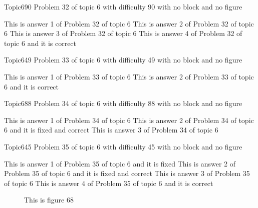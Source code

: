 \documentclass[master]{exam}
\begin{document}
\begin{problem}{Topic6}{90}
	Problem 32 of topic 6 with difficulty 90 with no block and no figure
	\begin{answers}
		\answer This is answer 1 of Problem 32 of topic 6 
		\answer This is answer 2 of Problem 32 of topic 6 
		\answer This is answer 3 of Problem 32 of topic 6 
		\answer[correct] This is answer 4 of Problem 32 of topic 6 and it is correct
	\end{answers}
\end{problem}

\begin{problem}{Topic6}{49}
	Problem 33 of topic 6 with difficulty 49 with no block and no figure
	\begin{answers}
		\answer This is answer 1 of Problem 33 of topic 6 
		\answer[correct] This is answer 2 of Problem 33 of topic 6 and it is correct
	\end{answers}
\end{problem}

\begin{problem}{Topic6}{88}
	Problem 34 of topic 6 with difficulty 88 with no block and no figure
	\begin{answers}
		\answer This is answer 1 of Problem 34 of topic 6 
		 This is answer 2 of Problem 34 of topic 6 and it is fixed and correct
		\answer This is answer 3 of Problem 34 of topic 6 
	\end{answers}
\end{problem}

\begin{problem}{Topic6}{45}
	Problem 35 of topic 6 with difficulty 45 with no block and no figure
	\begin{answers}
		\answer[fixed] This is answer 1 of Problem 35 of topic 6 and it is fixed
		 This is answer 2 of Problem 35 of topic 6 and it is fixed and correct
		\answer This is answer 3 of Problem 35 of topic 6 
		\answer[correct] This is answer 4 of Problem 35 of topic 6 and it is correct
	\end{answers}
\end{problem}



\begin{figure}
	\begin{center}
		This is figure 68 
		\label{fig:figure68}
	\end{center}
\end{figure}
\end{document}
